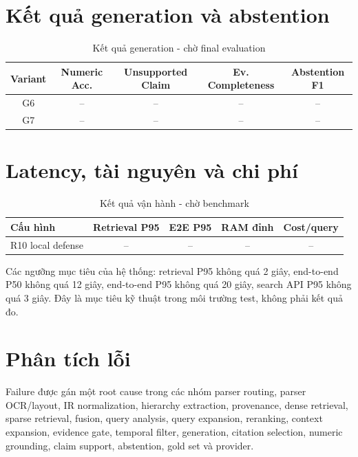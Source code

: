\documentclass[a4paper,12pt]{extreport}
\begin{document}
\section{Kết quả generation và abstention}

\begin{table}[H]
\caption{Kết quả generation - chờ final evaluation}
\small
\begin{tabularx}{\textwidth}{c c c c c}
\toprule
\textbf{Variant} & \textbf{Numeric Acc.} & \textbf{Unsupported Claim} & \textbf{Ev. Completeness} & \textbf{Abstention F1}\\
\midrule
G6 & -- & -- & -- & --\\
G7 & -- & -- & -- & --\\
\bottomrule
\end{tabularx}
\end{table}

\section{Latency, tài nguyên và chi phí}

\begin{table}[H]
\caption{Kết quả vận hành - chờ benchmark}
\begin{tabularx}{\textwidth}{X c c c c}
\toprule
\textbf{Cấu hình} & \textbf{Retrieval P95} & \textbf{E2E P95} & \textbf{RAM đỉnh} & \textbf{Cost/query}\\
\midrule
R10 local defense & -- & -- & -- & --\\
\bottomrule
\end{tabularx}
\end{table}

Các ngưỡng mục tiêu của hệ thống: retrieval P95 không quá 2 giây, end-to-end P50 không quá 12 giây, end-to-end P95 không quá 20 giây, search API P95 không quá 3 giây. Đây là mục tiêu kỹ thuật trong môi trường test, không phải kết quả đo.

\section{Phân tích lỗi}

Failure được gán một root cause trong các nhóm parser routing, parser OCR/layout, IR normalization, hierarchy extraction, provenance, dense retrieval, sparse retrieval, fusion, query analysis, query expansion, reranking, context expansion, evidence gate, temporal filter, generation, citation selection, numeric grounding, claim support, abstention, gold set và provider.
\end{document}
